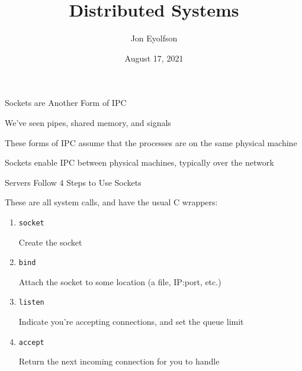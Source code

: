 

\title{Distributed Systems}
\author{Jon Eyolfson}
\date{August 17, 2021}


  \begin{frame}
    \titlepage
  \end{frame}

  \begin{frame}{Sockets are Another Form of IPC}

    We've seen pipes, shared memory, and signals

    \vspace{2em}

    These forms of IPC assume that the processes are on the same physical
    machine

    \vspace{2em}

    Sockets enable IPC between physical machines, typically over the network
  \end{frame}

  \begin{frame}{Servers Follow 4 Steps to Use Sockets}

    These are all system calls, and have the usual C wrappers:

    \vspace{2em}

    \begin{enumerate}
      \item \texttt{socket}

        \hspace{2em} Create the socket
      \item \texttt{bind}

        \hspace{2em} Attach the socket to some location (a file, IP:port, etc.)
      \item \texttt{listen}

        \hspace{2em} Indicate you're accepting connections, and set the queue limit
      \item \texttt{accept}

        \hspace{2em} Return the next incoming connection for you to handle
    \end{enumerate}
  \end{frame}

